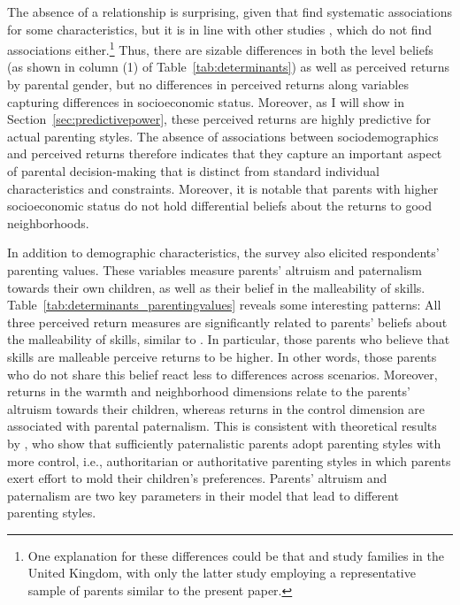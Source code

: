 \documentclass[12pt, a4paper, english]{article}
\begin{document}
The absence of a relationship is surprising, given that \citet{BonevaRauh2018} find systematic associations for some characteristics, but it is in line with other studies \citep[e.g.,][]{Attanasioetal2018}, which do not find associations either.\footnote{One explanation for these differences could be that \citet{BonevaRauh2018} and \citet{Attanasioetal2018} study families in the United Kingdom, with only the latter study employing a representative sample of parents similar to the present paper.} Thus, there are sizable differences in both the level beliefs (as shown in column (1) of Table~\ref{tab:determinants}) as well as perceived returns by parental gender, but no differences in perceived returns along variables capturing differences in socioeconomic status. Moreover, as I will show in Section~\ref{sec:predictivepower}, these perceived returns are highly predictive for actual parenting styles. The absence of associations between sociodemographics and perceived returns therefore indicates that they capture an important aspect of parental decision-making that is distinct from standard individual characteristics and constraints. Moreover, it is notable that parents with higher socioeconomic status do not hold differential beliefs about the returns to good neighborhoods.

In addition to demographic characteristics, the survey also elicited respondents' parenting values. These variables measure parents' altruism and paternalism towards their own children, as well as their belief in the malleability of skills. Table~\ref{tab:determinants_parentingvalues} reveals some interesting patterns: All three perceived return measures are significantly related to parents' beliefs about the malleability of skills, similar to \citet{BonevaRauh2018,Attanasioetal2018}. In particular, those parents who believe that skills are malleable perceive returns to be higher. In other words, those parents who do not share this belief react less to differences across scenarios. Moreover, returns in the warmth and neighborhood dimensions relate to the parents' altruism towards their children, whereas returns in the control dimension are associated with parental paternalism. This is consistent with theoretical results by \citet{DoepkeZilibotti2017}, who show that sufficiently paternalistic parents adopt parenting styles with more control, i.e., authoritarian or authoritative parenting styles in which parents exert effort to mold their children's preferences. 
Parents' altruism and paternalism are two key parameters in their model that lead to different parenting styles.
\end{document}
